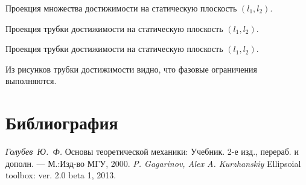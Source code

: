 \documentclass[a4paper, 14pt]{article}
\begin{document}
	\begin{center}
		Проекция множества достижимости на статическую плоскость $(l_1, l_2)$.
	\end{center}		
	\begin{center}
		Проекция трубки достижимости на статическую плоскость $(l_1, l_2)$.
	\end{center}	
	\begin{center}
		Проекция трубки достижимости на статическую плоскость $(l_1, l_2)$.
	\end{center}	
	
	Из рисунков трубки достижимости видно, что фазовые ограничения выполняются.
\section{Библиография}
  \begin{thebibliography}{99}
     \emph{Голубев~Ю.~Ф.} Основы теоретической механики: Учебник. 2-е изд., перераб. и дополн. --- М.:Изд-во МГУ, 2000.
     \emph{P. Gagarinov, Alex A. Kurzhanskiy} Ellipsoial toolbox: ver. 2.0 beta 1, 2013.
  \end{thebibliography}
\end{document}
